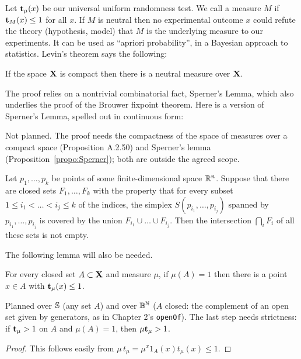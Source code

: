 Let \( \mathbf{t}_{\mu}(x) \) be our universal uniform randomness test.
We call a measure \( M \)  if
\( \mathbf{t}_{M}(x) \le 1 \) for all \( x \).
If \( M \) is neutral then no experimental outcome \( x \) could 
refute the theory (hypothesis, model)
that \( M \) is the underlying measure to our experiments.
It can be used as ``apriori probability'', in a Bayesian approach to
statistics.
Levin's theorem says the following:

 \begin{theorem}\label{thm:neutral-meas}
  \notready
If the space \( \mathbf{X} \) is compact then there is a neutral measure over \( \mathbf{X} \).
 \end{theorem}
 The proof relies on a nontrivial combinatorial fact,
Sperner's Lemma, which also underlies the proof of the Brouwer fixpoint
theorem.
Here is a version of Sperner's Lemma, spelled out in continuous form:


\begin{formalization}
Not planned. The proof needs the compactness of the space of measures over a compact space
(Proposition A.2.50) and Sperner's lemma (Proposition~\ref{propo:Sperner}); both are outside the
agreed scope.
\end{formalization}
 \begin{proposition}\label{propo:Sperner}
  \notready
Let \( p_{1},\dots,p_{k} \) be points of some finite-dimensional space
\( \mathbb{R}^{n} \).
Suppose that there are closed sets \( F_{1},\dots,F_{k} \)
with the property that for every subset \( 1 \le i_{1} < \dots < i_{j} \le k \)
of the indices, the simplex \( S(p_{i_{1}},\dots,p_{i_{j}}) \) spanned by
\( p_{i_{1}},\dots,p_{i_{j}} \) is covered by
the union \( F_{i_{1}} \cup \dots \cup F_{i_{j}} \).
Then the intersection \( \bigcap_{i} F_{i} \) of all these sets is not empty.
 \end{proposition}

The following lemma will also be needed.

 \begin{lemma}\label{lem:concentr}
For every closed set \( A \subset \mathbf{X} \) and measure \( \mu \), if \( \mu(A)=1 \) then
there is a point \( x\in A \) with \( \mathbf{t}_{\mu}(x) \le 1 \).
 \end{lemma}

\begin{formalization}
Planned over $\mathbb{S}$ (any set $A$) and over $\mathbb{B}^{\mathbb{N}}$ ($A$ closed: the complement of an open set
given by generators, as in Chapter 2's \texttt{openOf}). The last step needs strictness: if
$\mathbf{t}_{\mu}>1$ on $A$ and $\mu(A) = 1$, then $\mu\mathbf{t}_{\mu}>1$.
\end{formalization}
 \begin{proof}
This follows easily from 
\( \mu\, t_{\mu} = \mu^{x} 1_{A}(x)t_{\mu}(x) \le 1 \).
 \end{proof} 

